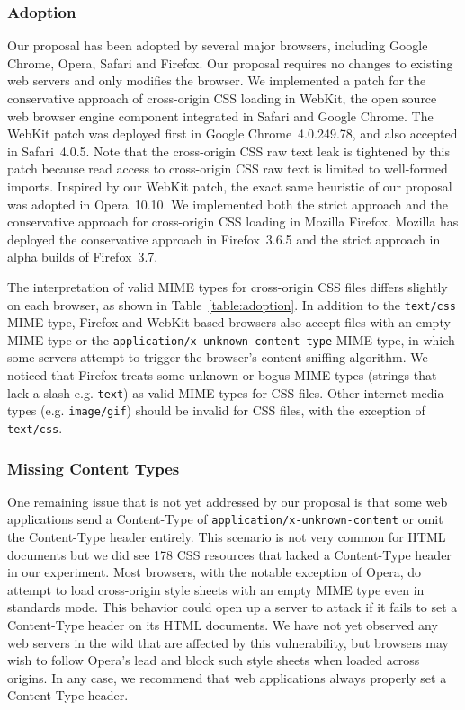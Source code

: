 \documentclass{acm_proc_article-sp}
\begin{document}
\subsubsection{Adoption}
Our proposal has been adopted by several major browsers, including Google Chrome, Opera, Safari and Firefox. Our proposal requires no changes to existing web servers and only modifies the browser. We implemented a patch for the conservative approach of cross-origin CSS loading in WebKit, the open source web browser engine component integrated in Safari and Google Chrome. The WebKit patch was deployed first in Google Chrome~4.0.249.78, and also accepted in Safari~4.0.5. Note that the cross-origin CSS raw text leak is tightened by this patch because read access to cross-origin CSS raw text is limited to well-formed imports. Inspired by our WebKit patch, the exact same heuristic of our proposal was adopted in Opera~10.10. We implemented both the strict approach and the conservative approach for cross-origin CSS loading in Mozilla Firefox. Mozilla has deployed the conservative approach in Firefox~3.6.5 and the strict approach in alpha builds of Firefox~3.7.

The interpretation of valid MIME types for cross-origin CSS files differs slightly on each browser, as shown in Table~\ref{table:adoption}. In addition to the \texttt{text/css} MIME type, Firefox and WebKit-based browsers also accept files with an empty MIME type or the \texttt{application/x-unknown-content-type} MIME type, in which some servers attempt to trigger the browser's content-sniffing algorithm. We noticed that Firefox treats some unknown or bogus MIME types (strings that lack a slash e.g. \texttt{text}) as valid MIME types for CSS files. Other internet media types (e.g. \texttt{image/gif}) should be invalid for CSS files, with the exception of \texttt{text/css}.

\subsubsection{Missing Content Types}

One remaining issue that is not yet addressed by our proposal is that some web
applications send a Content-Type of \verb|application/x-unknown-content|
or omit the Content-Type header entirely. 
This scenario is not very common for HTML documents but we did see 178 CSS resources that lacked a Content-Type header in our experiment. Most browsers,
with the notable exception of Opera, do attempt to load cross-origin
style sheets with an empty MIME type even in standards mode. 
This behavior could open up a server
to attack if it fails to set a Content-Type header on its HTML documents. We
have not yet observed any web servers in the wild that are affected by this
vulnerability, but browsers may wish to follow Opera's lead and block such
style sheets when loaded across origins. In any case, we recommend that web
applications always properly set a Content-Type header.
\end{document}

